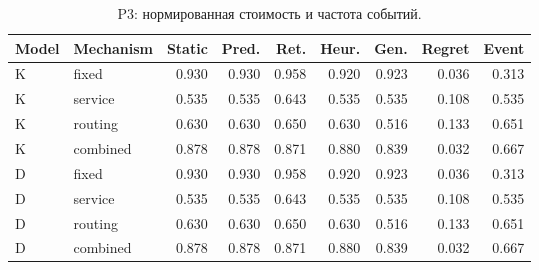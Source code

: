 \begin{table}[htbp]\caption{P3: нормированная стоимость и частота событий.}\centering\small\setlength{\tabcolsep}{3pt}

\begin{tabular}{llrrrrrrr}\toprule

Model & Mechanism & Static & Pred. & Ret. & Heur. & Gen. & Regret & Event\\\midrule

K & fixed & 0.930 & 0.930 & 0.958 & 0.920 & 0.923 & 0.036 & 0.313\\

K & service & 0.535 & 0.535 & 0.643 & 0.535 & 0.535 & 0.108 & 0.535\\

K & routing & 0.630 & 0.630 & 0.650 & 0.630 & 0.516 & 0.133 & 0.651\\

K & combined & 0.878 & 0.878 & 0.871 & 0.880 & 0.839 & 0.032 & 0.667\\

D & fixed & 0.930 & 0.930 & 0.958 & 0.920 & 0.923 & 0.036 & 0.313\\

D & service & 0.535 & 0.535 & 0.643 & 0.535 & 0.535 & 0.108 & 0.535\\

D & routing & 0.630 & 0.630 & 0.650 & 0.630 & 0.516 & 0.133 & 0.651\\

D & combined & 0.878 & 0.878 & 0.871 & 0.880 & 0.839 & 0.032 & 0.667\\

\bottomrule\end{tabular}\end{table}

